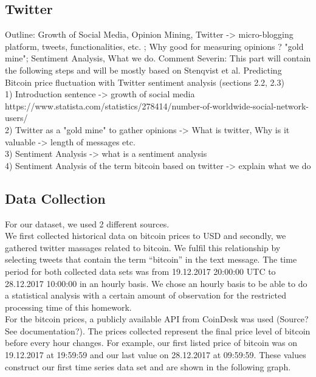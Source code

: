 \documentclass[a4paper,american,12pt]{article}
\begin{document}
\begin{spacing}{1.2}
\subsection{Twitter}
Outline: Growth of Social Media, Opinion Mining, Twitter -> micro-blogging platform, tweets, functionalities, etc. ; Why good for measuring opinions ?  "gold mine"; Sentiment Analysis, What we do.
Comment Severin: This part will contain the following steps and will be mostly based on Stenqvist et al. Predicting Bitcoin price fluctuation with Twitter sentiment analysis  (sections 2.2, 2.3)\\

1) Introduction sentence -> growth of social media https://www.statista.com/statistics/278414/number-of-worldwide-social-network-users/\\
2) Twitter as a "gold mine" to gather opinions -> What is twitter, Why is it valuable -> length of messages etc.\\
3) Sentiment Analysis -> what is a sentiment analysis\\
4) Sentiment Analysis of the term bitcoin based on twitter -> explain what we do \\
		
\subsection{Data Collection}
For our dataset, we used 2 different sources.\\
We first collected historical data on bitcoin prices to USD and secondly, we gathered twitter massages related to bitcoin. We fulfil this relationship by selecting tweets that contain the term “bitcoin” in the text message. The time period for both collected data sets was from 19.12.2017 20:00:00 UTC to 28.12.2017 10:00:00 in an hourly basis. We chose an hourly basis to be able to do a statistical analysis with a certain amount of observation for the restricted processing time of this homework.\\

For the bitcoin prices, a publicly available API from CoinDesk was used (Source? See documentation?). The prices collected represent the final price level of bitcoin before every hour changes. For example, our first listed price of bitcoin was on 19.12.2017 at 19:59:59 and our last value on 28.12.2017 at 09:59:59. These values construct our first time series data set and are shown in the following graph.\\


\end{spacing}
\end{document}
